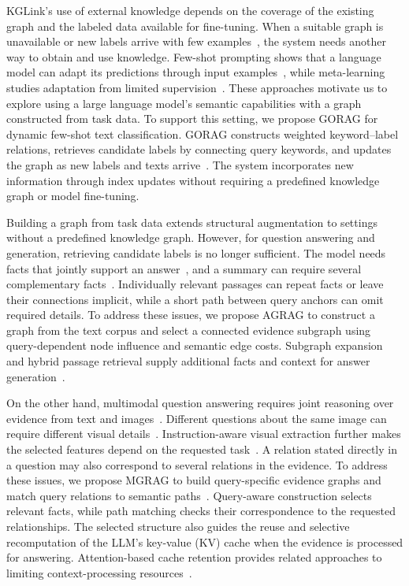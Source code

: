 KGLink's use of external knowledge depends on the coverage of the existing graph and the labeled data available for fine-tuning. When a suitable graph is unavailable or new labels arrive with few examples~\cite{gorag-xia-etal-2021-incremental}, the system needs another way to obtain and use knowledge. Few-shot prompting shows that a language model can adapt its predictions through input examples~\cite{lit-brown2020language}, while meta-learning studies adaptation from limited supervision~\cite{lit-finn2017model}. These approaches motivate us to explore using a large language model's semantic capabilities with a graph constructed from task data. To support this setting, we propose GORAG for dynamic few-shot text classification. GORAG constructs weighted keyword--label relations, retrieves candidate labels by connecting query keywords, and updates the graph as new labels and texts arrive~\cite{gorag-paper}. The system incorporates new information through index updates without requiring a predefined knowledge graph or model fine-tuning.

Building a graph from task data extends structural augmentation to settings without a predefined knowledge graph. However, for question answering and generation, retrieving candidate labels is no longer sufficient. The model needs facts that jointly support an answer~\cite{bg-hipporag}, and a summary can require several complementary facts~\cite{bg-graphrag}. Individually relevant passages can repeat facts or leave their connections implicit, while a short path between query anchors can omit required details. To address these issues, we propose AGRAG to construct a graph from the text corpus and select a connected evidence subgraph using query-dependent node influence and semantic edge costs. Subgraph expansion and hybrid passage retrieval supply additional facts and context for answer generation~\cite{agrag-paper}.

On the other hand, multimodal question answering requires joint reasoning over evidence from text and images~\cite{bg-mmqa}. Different questions about the same image can require different visual details~\cite{bg-stacked-attention,lit-antol2015vqa}. Instruction-aware visual extraction further makes the selected features depend on the requested task~\cite{lit-dai2023instructblip}. A relation stated directly in a question may also correspond to several relations in the evidence.
To address these issues, we propose MGRAG to build query-specific evidence graphs and match query relations to semantic paths~\cite{mgrag-paper}. Query-aware construction selects relevant facts, while path matching checks their correspondence to the requested relationships. The selected structure also guides the reuse and selective recomputation of the LLM's key-value (KV) cache when the evidence is processed for answering. Attention-based cache retention provides related approaches to limiting context-processing resources~\cite{lit-zhang2023h2o,lit-liu2023scissorhands}.

